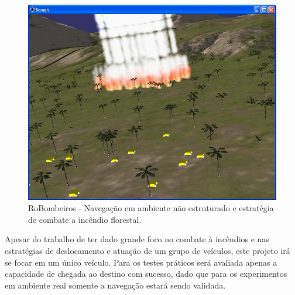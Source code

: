 \begin{figure}[ht]
	\begin{minipage}[b]{0.95\linewidth}
	    \centering
	    \includegraphics[width=12cm]{images/fogo30905osg.jpg}
	 	\caption{RoBombeiros - Navegação em ambiente não estruturado e estratégia de
	 	combate a incêndio florestal.}
	 	\label{fig:incendio}
	\end{minipage}
\end{figure}

Apesar do trabalho de \cite{Pessin2008} ter dado grande foco no combate à
incêndios e nas estratégias de deslocamento e atuação de um grupo de veículos,
este projeto irá se focar em um único veículo. Para os testes práticos será
avaliada apenas a capacidade de chegada ao destino com sucesso, dado que para
os experimentos em ambiente real somente a navegação estará sendo validada.



%
%



